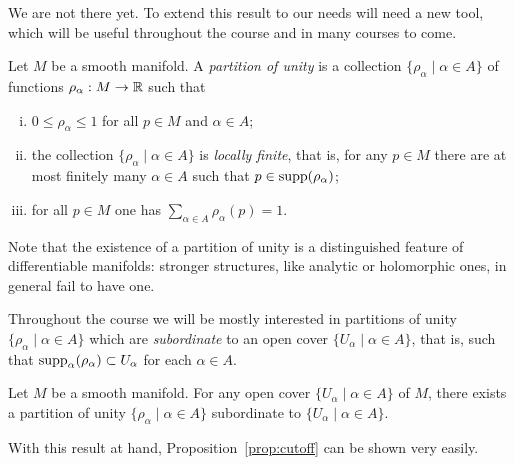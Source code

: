 We are not there yet. To extend this result to our needs will need a new tool, which will be useful throughout the course and in many courses to come.

\begin{definition}
  Let $M$ be a smooth manifold. A \emph{partition of unity} is a collection $\{\rho_\alpha \mid \alpha\in A\}$ of functions $\rho_\alpha:M\to\mathbb{R}$ such that
  \begin{enumerate}[(i)]
    \item $0 \leq \rho_\alpha \leq 1$ for all $p\in M$ and $\alpha\in A$;
          \item\label{def:pou.2} the collection $\{\rho_\alpha \mid \alpha\in A\}$ is \emph{locally finite}, that is, for any $p\in M$ there are at most finitely many $\alpha\in A$ such that $p\in\operatorname{supp}(\rho_\alpha)$;
    \item for all $p\in M$ one has $\sum_{\alpha\in A} \rho_\alpha(p) = 1$.
  \end{enumerate}
\end{definition}

\begin{remark}
  Note that the existence of a partition of unity is a distinguished feature of differentiable manifolds: stronger structures, like analytic or holomorphic ones, in general fail to have one.
\end{remark}

Throughout the course we will be mostly interested in partitions of unity $\{\rho_\alpha \mid \alpha\in A\}$ which are \emph{subordinate} to an open cover $\{U_\alpha\mid\alpha\in A\}$, that is, such that $\operatorname{supp}_\alpha(\rho_\alpha) \subset U_\alpha$ for each $\alpha\in A$.

\begin{theorem}\label{thm:partitionof1}
  Let $M$ be a smooth manifold. For any open cover $\{U_\alpha\mid\alpha\in A\}$ of $M$, there exists a partition of unity $\{\rho_\alpha \mid \alpha\in A\}$ subordinate to $\{U_\alpha\mid\alpha\in A\}$.
\end{theorem}

With this result at hand, Proposition~\ref{prop:cutoff} can be shown very easily.


